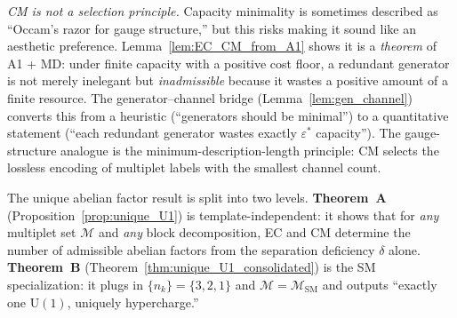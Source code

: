 \documentclass[11pt,a4paper]{article}
\theoremstyle{definition}
\newcommand{\U}{\mathrm{U}}
\begin{document}
\smallskip\noindent\textit{CM is not a selection principle.}\quad
Capacity minimality is sometimes described as ``Occam's razor for gauge
structure,'' but this risks making it sound like an aesthetic preference.
Lemma~\ref{lem:EC_CM_from_A1} shows it is a \emph{theorem} of A1 +
MD: under finite capacity with a positive cost floor, a redundant
generator is not merely inelegant but \emph{inadmissible} because it
wastes a positive amount of a finite resource.  The generator--channel
bridge (Lemma~\ref{lem:gen_channel}) converts this from a heuristic
(``generators should be minimal'') to a quantitative statement
(``each redundant generator wastes exactly $\varepsilon^*$ capacity'').
The gauge-structure analogue is the
minimum-description-length principle: CM selects the lossless encoding
of multiplet labels with the smallest channel count.

\smallskip\noindent The unique abelian factor result is split into two
levels.  \textbf{Theorem~A} (Proposition~\ref{prop:unique_U1}) is
template-independent: it shows that for \emph{any} multiplet set
$\mathcal{M}$ and \emph{any} block decomposition, EC and CM determine
the number of admissible abelian factors from the separation deficiency
$\delta$ alone.  \textbf{Theorem~B}
(Theorem~\ref{thm:unique_U1_consolidated}) is the SM specialization:
it plugs in $\{n_k\} = \{3, 2, 1\}$ and $\mathcal{M} =
\mathcal{M}_{\mathrm{SM}}$ and outputs ``exactly one $\U(1)$,
uniquely hypercharge.''
\end{document}
